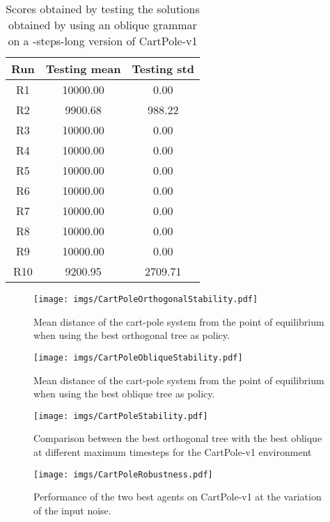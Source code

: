 \documentclass[review,english]{elsarticle}
\begin{document}
\begin{table}[ht!]
    \centering
    \begin{tabular}{|c|c|c|} \hline
        \textbf{Run} & \textbf{Testing mean} & \textbf{Testing std} \\ \hline
        R1 & 10000.00 & 0.00 \\ R2 & 9900.68 & 988.22 \\ R3 & 10000.00 & 0.00 \\ R4 & 10000.00 & 0.00 \\ R5 & 10000.00 & 0.00 \\ R6 & 10000.00 & 0.00 \\ R7 & 10000.00 & 0.00 \\ R8 & 10000.00 & 0.00 \\ R9 & 10000.00 & 0.00 \\ R10 & 9200.95 & 2709.71 \\ \hline
    \end{tabular}
    \caption{Scores obtained by testing the solutions obtained by using an oblique grammar on a -steps-long version of CartPole-v1}
    \label{tab:cp_obl_10000steps}
\end{table}

\begin{figure}[p]
    \centering
    \texttt{[image: imgs/CartPoleOrthogonalStability.pdf]}
    \caption{Mean distance of the cart-pole system from the point of equilibrium when using the best orthogonal tree as policy.}
    \label{fig:cp_ort_stability}
\end{figure}

\begin{figure}
    \centering
    \texttt{[image: imgs/CartPoleObliqueStability.pdf]}
    \caption{Mean distance of the cart-pole system from the point of equilibrium when using the best oblique tree as policy.}
    \label{fig:cp_obl_stability}
\end{figure}

\begin{figure}
    \centering
    \texttt{[image: imgs/CartPoleStability.pdf]}
    \caption{Comparison between the best orthogonal tree with the best oblique at different maximum timesteps for the CartPole-v1 environment}
    \label{fig:cp_timesteps_comparison}
\end{figure}

\begin{figure}
    \centering
    \texttt{[image: imgs/CartPoleRobustness.pdf]}
    \caption{Performance of the two best agents on CartPole-v1 at the variation of the input noise.}
    \label{fig:cp_noise_comparison}
\end{figure}
\end{document}
